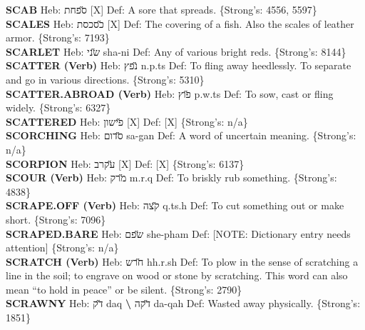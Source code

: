 {\textbf{SCAB} Heb: {\large\H ספחת} {[}X{]} Def: A sore that spreads. \{Strong's: 4556, 5597\}\hfill{}\\

\textbf{SCALES} Heb: {\large\H כסכסת} {[}X{]} Def: The covering of a fish. Also the scales of leather armor. \{Strong's: 7193\}\hfill{}\\

\textbf{SCARLET} Heb: {\large\H שני} sha-ni Def: Any of various bright reds. \{Strong's: 8144\}\hfill{}\\

\textbf{SCATTER (Verb)} Heb: {\large\H נפץ} n.p.ts Def: To fling away heedlessly. To separate and go in various directions. \{Strong's: 5310\}\hfill{}\\

\textbf{SCATTER.ABROAD (Verb)} Heb: {\large\H פוץ} p.w.ts Def: To sow, cast or fling widely. \{Strong's: 6327\}\hfill{}\\

\textbf{SCATTERED} Heb: {\large\H פישון} {[}X{]} Def: {[}X{]} \{Strong's: n/a\}\hfill{}\\

\textbf{SCORCHING} Heb: {\large\H סדום} sa-gan Def: A word of uncertain meaning. \{Strong's: n/a\}\hfill{}\\

\textbf{SCORPION} Heb: {\large\H עקרב} {[}X{]} Def: {[}X{]} \{Strong's: 6137\}\hfill{}\\

\textbf{SCOUR (Verb)} Heb: {\large\H מרק} m.r.q Def: To briskly rub something. \{Strong's: 4838\}\hfill{}\\

\textbf{SCRAPE.OFF (Verb)} Heb: {\large\H קצה} q.ts.h Def: To cut something out or make short. \{Strong's: 7096\}\hfill{}\\

\textbf{SCRAPED.BARE} Heb: {\large\H שפם} she-pham Def: {[}NOTE: Dictionary entry needs attention{]} \{Strong's: n/a\}\hfill{}\\

\textbf{SCRATCH (Verb)} Heb: {\large\H חרש} hh.r.sh Def: To plow in the sense of scratching a line in the soil; to engrave on wood or stone by scratching. This word can also mean ``to hold in peace'' or be silent. \{Strong's: 2790\}\hfill{}\\

\textbf{SCRAWNY} Heb: {\large\H דק} daq \textbf{\textbackslash{}} {\large\H דקה} da-qah Def: Wasted away physically. \{Strong's: 1851\}\hfill{}\\

}
